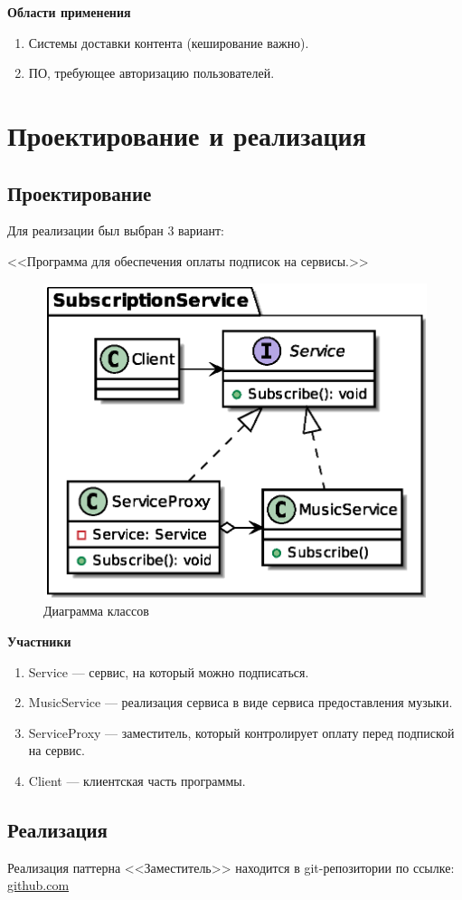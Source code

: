 \documentclass[PI,LAB]{HSEUniversity}
\begin{document}
\textbf{Области применения}

\begin{enumerate}
	\item Системы доставки контента (кеширование важно).
	\item ПО, требующее авторизацию пользователей.
\end{enumerate}

\chapter{Проектирование и реализация}
\section{Проектирование}
Для реализации был выбран 3 вариант:

<<Программа для обеспечения оплаты подписок на сервисы.>>

 \begin{figure}[h]
   \centering
   \includegraphics[scale=0.75]{Task_CD.eps}
   \caption{Диаграмма классов}
   \label{fig:Task_CD}
 \end{figure}

\textbf{Участники}

\begin{enumerate}
	\item Service --- сервис, на который можно подписаться.
	\item MusicService --- реализация сервиса в виде сервиса предоставления музыки.
	\item ServiceProxy --- заместитель, который контролирует оплату перед подпиской на сервис.
	\item Client --- клиентская часть программы.
\end{enumerate}

\section{Реализация}
Реализация паттерна <<Заместитель>> находится в git-репозитории по ссылке: \href{https://github.com/rovany706/design-patterns/}{github.com}
\end{document}
